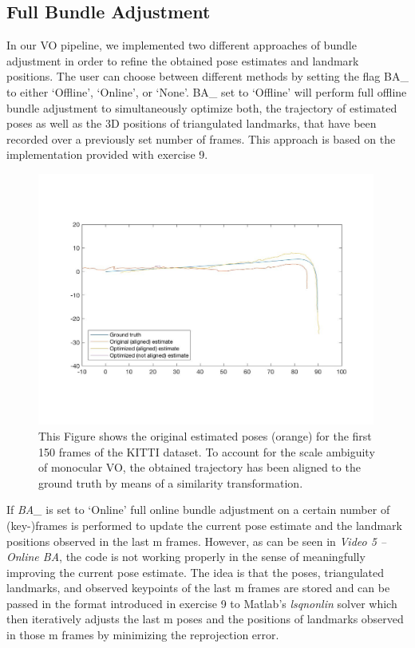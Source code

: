 \subsection{Full Bundle Adjustment}

In our VO pipeline, we implemented two different approaches of bundle adjustment in order to refine the obtained pose estimates and landmark positions. The user can choose between different methods by setting the flag BA\_ to either ‘Offline’, ‘Online’, or ‘None’. 
BA\_ set to ‘Offline’ will perform full offline bundle adjustment to simultaneously optimize both, the trajectory of estimated poses as well as the 3D positions of triangulated landmarks, that have been recorded over a previously set number of frames. This approach is based on the implementation provided with exercise 9. 

\begin{figure}
\includegraphics[width=0.99\textwidth]{files/aligned_optimized.jpg}
\caption[\label{f:aligned_optimized}Offline Bundle Adjustment]{This Figure shows the original estimated poses (orange) for the first 150 frames of the KITTI dataset. To account for the scale ambiguity of monocular VO, the obtained trajectory has been aligned to the ground truth by means of a similarity transformation.}
\end{figure}

If \textit{BA\_} is set to ‘Online’ full online bundle adjustment on a certain number of (key-)frames is performed to update the current pose estimate and the landmark positions observed in the last m frames. However, as can be seen in \textit{Video 5 – Online BA}, the code is not working properly in the sense of meaningfully improving the current pose estimate. The idea is that the poses, triangulated landmarks, and observed keypoints of the last m frames are stored and can be passed in the format introduced in exercise 9 to Matlab’s \textit{lsqnonlin} solver which then iteratively adjusts the last m poses and the positions of landmarks observed in those m frames by minimizing the reprojection error.  



